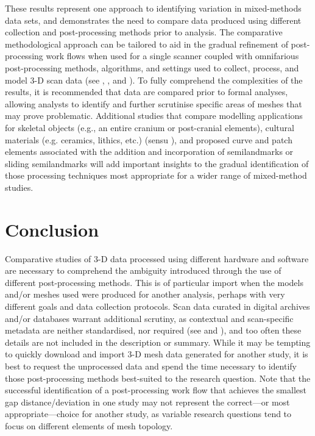 \documentclass[review]{elsarticle}
\begin{document}
These results represent one approach to identifying variation in mixed-methods data sets, and demonstrates the need to compare data produced using different collection and post-processing methods prior to analysis. The comparative methodological approach can be tailored to aid in the gradual refinement of post-processing work flows when used for a single scanner coupled with omnifarious post-processing methods, algorithms, and settings used to collect, process, and model 3-D scan data (see \citealp[22-23 and Figure 2]{RN11473}, \citealp{RN8025}, and \citealp[Figure 4]{sj2021}). To fully comprehend the complexities of the results, it is recommended that data are compared prior to formal analyses, allowing analysts to identify and further scrutinise specific areas of meshes that may prove problematic. Additional studies that compare modelling applications for skeletal objects (e.g., an entire cranium or post-cranial elements), cultural materials (e.g. ceramics, lithics, etc.) (sensu \citealp{RN8074,RN7927,RN8158,RN8370,RN8322,RN8312}), and proposed curve and patch elements associated with the addition and incorporation of semilandmarks or sliding semilandmarks will add important insights to the gradual identification of those processing techniques most appropriate for a wider range of mixed-method studies.

\section{Conclusion}

Comparative studies of 3-D data processed using different hardware and software are necessary to comprehend the ambiguity introduced through the use of different post-processing methods. This is of particular import when the models and/or meshes used were produced for another analysis, perhaps with very different goals and data collection protocols. Scan data curated in digital archives and/or databases warrant additional scrutiny, as contextual and scan-specific metadata are neither standardised, nor required (see \citealt{RN5932} and \citealt{RN11507}), and too often these details are not included in the description or summary. While it may be tempting to quickly download and import 3-D mesh data generated for another study, it is best to request the unprocessed data and spend the time necessary to identify those post-processing methods best-suited to the research question. Note that the successful identification of a post-processing work flow that achieves the smallest gap distance/deviation in one study may not represent the correct---or most appropriate---choice for another study, as variable research questions tend to focus on different elements of mesh topology. 
\end{document}
